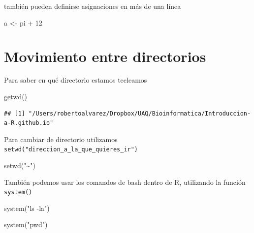 \documentclass[
]{book}
\newenvironment{Shaded}{\begin{snugshade}}{\end{snugshade}}
\newcommand{\DecValTok}[1]{\textcolor[rgb]{0.00,0.00,0.81}{#1}}
\newcommand{\FunctionTok}[1]{\textcolor[rgb]{0.00,0.00,0.00}{#1}}
\newcommand{\NormalTok}[1]{#1}
\newcommand{\OtherTok}[1]{\textcolor[rgb]{0.56,0.35,0.01}{#1}}
\newcommand{\SpecialCharTok}[1]{\textcolor[rgb]{0.00,0.00,0.00}{#1}}
\newcommand{\StringTok}[1]{\textcolor[rgb]{0.31,0.60,0.02}{#1}}
\begin{document}
también pueden definirse asignaciones en más de una línea

\begin{Shaded}
\begin{Highlighting}[]
\NormalTok{a }\OtherTok{\textless{}{-}}
\NormalTok{  pi }\SpecialCharTok{+} \DecValTok{12}
\end{Highlighting}
\end{Shaded}

\hypertarget{movimiento-entre-directorios}{%
\section{Movimiento entre directorios}\label{movimiento-entre-directorios}}

Para saber en qué directorio estamos tecleamos

\begin{Shaded}
\begin{Highlighting}[]
\FunctionTok{getwd}\NormalTok{()}
\end{Highlighting}
\end{Shaded}

\begin{verbatim}
## [1] "/Users/robertoalvarez/Dropbox/UAQ/Bioinformatica/Introduccion-a-R.github.io"
\end{verbatim}

Para cambiar de directorio utilizamos \texttt{setwd("direccion\_a\_la\_que\_quieres\_ir")}

\begin{Shaded}
\begin{Highlighting}[]
\FunctionTok{setwd}\NormalTok{(}\StringTok{"\textasciitilde{}"}\NormalTok{)}
\end{Highlighting}
\end{Shaded}

También podemos usar los comandos de bash dentro de R, utilizando la función \texttt{system()}

\begin{Shaded}
\begin{Highlighting}[]
\FunctionTok{system}\NormalTok{(}\StringTok{"ls {-}la"}\NormalTok{)}
\end{Highlighting}
\end{Shaded}

\begin{Shaded}
\begin{Highlighting}[]
\FunctionTok{system}\NormalTok{(}\StringTok{"pwd"}\NormalTok{)}
\end{Highlighting}
\end{Shaded}
\end{document}
